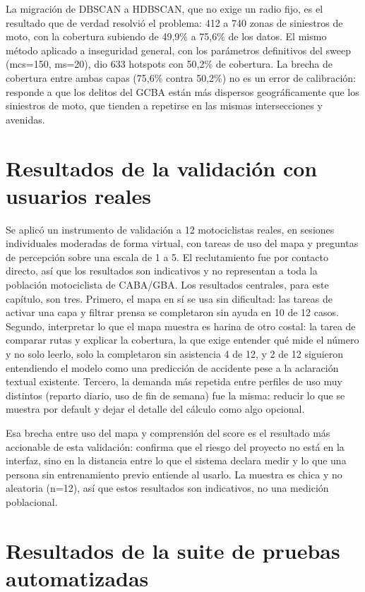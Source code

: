 La migración de DBSCAN a HDBSCAN, que no exige un radio fijo, es el
resultado que de verdad resolvió el problema: 412 a 740 zonas de
siniestros de moto, con la cobertura subiendo de 49,9\% a 75,6\% de los
datos. El mismo método aplicado a inseguridad general, con los
parámetros definitivos del sweep (mcs=150, ms=20), dio 633 hotspots con
50,2\% de cobertura. La brecha de cobertura entre ambas capas (75,6\%
contra 50,2\%) no es un error de calibración: responde a que los delitos
del GCBA están más dispersos geográficamente que los siniestros de moto,
que tienden a repetirse en las mismas intersecciones y avenidas.

\section{Resultados de la validación con usuarios reales}

Se aplicó un instrumento de validación a 12 motociclistas reales, en
sesiones individuales moderadas de forma virtual, con tareas de uso del
mapa y preguntas de percepción sobre una escala de 1 a 5. El
reclutamiento fue por contacto directo, así que los resultados son
indicativos y no representan a toda la población motociclista de
CABA/GBA. Los resultados centrales, para este capítulo, son tres.
Primero, el mapa en sí se usa sin dificultad: las tareas de activar una
capa y filtrar prensa se completaron sin ayuda en 10 de 12 casos.
Segundo, interpretar lo que el mapa muestra es harina de otro costal: la
tarea de comparar rutas y explicar la cobertura, la que exige entender
qué mide el número y no solo leerlo, solo la completaron sin asistencia
4 de 12, y 2 de 12 siguieron entendiendo el modelo como una predicción
de accidente pese a la aclaración textual existente. Tercero, la demanda
más repetida entre perfiles de uso muy distintos (reparto diario, uso de
fin de semana) fue la misma: reducir lo que se muestra por default y
dejar el detalle del cálculo como algo opcional.

Esa brecha entre uso del mapa y comprensión del score es el resultado
más accionable de esta validación: confirma que el riesgo del proyecto
no está en la interfaz, sino en la distancia entre lo que el sistema
declara medir y lo que una persona sin entrenamiento previo entiende al
usarlo. La muestra es chica y no aleatoria (n=12), así que estos
resultados son indicativos, no una medición poblacional.

\section{Resultados de la suite de pruebas automatizadas}


